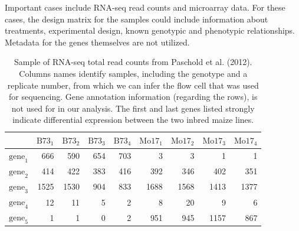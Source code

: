 Important cases include RNA-seq read counts and microarray data. For these cases, the design matrix for the samples could include information about treatments, experimental design, known genotypic and phenotypic relationships. Metadata for the genes themselves are not utilized.


\begin{table}[ht]
\centering
\caption{\small Sample of RNA-seq total read counts from Paschold et al. (2012). Columns names identify samples, including the genotype and a replicate number, from which we can infer the flow cell that was used for sequencing. Gene annotation information (regarding the rows), is not used for in our analysis. The first and last genes listed strongly indicate differential expression between the two inbred maize lines.}
\label{tab:data}
\vspace{.25cm}
\begin{tabular}{lrrrrrrrr}
  \hline
& $\mbox{B73}_1$ & $\mbox{B73}_2$ & $\mbox{B73}_3$ & $\mbox{B73}_4$ & $\mbox{Mo17}_1$ & $\mbox{Mo17}_2$ & $\mbox{Mo17}_3$ & $\mbox{Mo17}_4$ \\ 
  \hline
$\mbox{gene}_1$ & 666 & 590 & 654 & 703 &   3 &   3 &   1 &   1 \\ 
$\mbox{gene}_2$& 414 & 422 & 383 & 416 & 392 & 346 & 402 & 351 \\ 
  $\mbox{gene}_3$ & 1525 & 1530 & 904 & 833 & 1688 & 1568 & 1413 & 1377 \\ 
  $\mbox{gene}_4$ &  12 &  11 &   5 &   2 &   8 &  20 &   9 &   6 \\ 
  $\mbox{gene}_5$ &   1 &   1 &   0 &   2 & 951 & 945 & 1157 & 867 \\ 
   \hline
\end{tabular}
\end{table}
